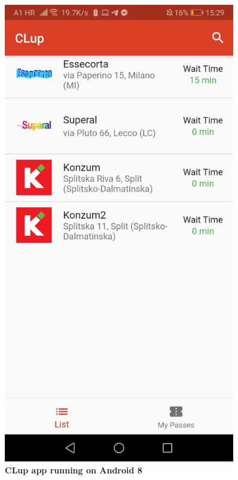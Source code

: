 \begin{figure}[!htb]
\centering
\begin{minipage}{0.45\textwidth}
\centering
\includegraphics[width=0.9\textwidth]{Images/AppClup}
\captionsetup{justification=centering}
\caption{\label{fig:appandroid1}\textbf{CLup app running on Android 8}}
\end{minipage}
\begin{minipage}{0.45\textwidth}
\centering

\end{minipage}
\end{figure}
